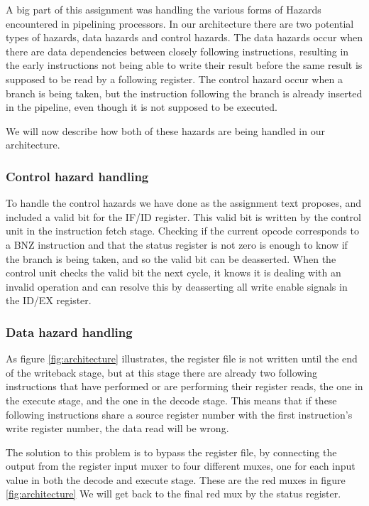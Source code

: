 \documentclass[11pt]{report}
\begin{document}
A big part of this assignment was handling the various forms of Hazards 
encountered in pipelining processors. In our architecture there are two potential
types of hazards, data hazards and control hazards. The data hazards occur when there 
are data dependencies between closely following instructions, resulting in the
early instructions not being able to write their result before the same result is 
supposed to be read by a following register. The control hazard occur when a branch
is being taken, but the instruction following the branch is already inserted in the pipeline,
even though it is not supposed to be executed.

We will now describe how both of these hazards are being handled in our architecture.

\subsubsection*{Control hazard handling}

To handle the control hazards we have done as the assignment text proposes, and included
a valid bit for the IF/ID register. This valid bit is written by the control unit in the
instruction fetch stage. Checking if the current opcode 
corresponds to a BNZ instruction and that the status register is not zero
is enough to know if the branch is being taken, and so the valid bit can be deasserted. 
When the control unit checks the valid bit the next cycle, it knows it is dealing with an 
invalid operation and can resolve this by deasserting all write enable signals in the 
ID/EX register.

\subsubsection*{Data hazard handling}

As figure \ref{fig:architecture}
illustrates, the register file is not written until the end of the 
writeback stage, but at this stage there are already two following instructions that
have performed or are performing their register reads, the one in the execute stage, 
and the one in the 
decode stage. This means that if these following instructions share a source register
number with the first instruction's write register number, the data read will be wrong. 

The solution to this problem is to bypass the register file, by connecting the output
from the register input muxer to four different muxes, one for each input value in both
the decode and execute stage. These are the red muxes in figure \ref{fig:architecture}
We will get back to the final red mux by the status register. 
\end{document}
